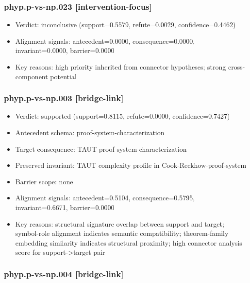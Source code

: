 \documentclass[
]{article}
\newcounter{none} %
\providecommand{\tightlist}{%
  \setlength{\itemsep}{0pt}\setlength{\parskip}{0pt}}
\begin{document}
\subsubsection{phyp.p-vs-np.023
{[}intervention-focus{]}}\label{phypp-vs-np023-intervention-focus}

\begin{itemize}
\tightlist
\item
  Verdict: inconclusive (support=0.5579, refute=0.0029,
  confidence=0.4462)
\item
  Alignment signals: antecedent=0.0000, consequence=0.0000,
  invariant=0.0000, barrier=0.0000
\item
  Key reasons: high priority inherited from connector hypotheses; strong
  cross-component potential
\end{itemize}

\subsubsection{phyp.p-vs-np.003
{[}bridge-link{]}}\label{phypp-vs-np003-bridge-link}

\begin{itemize}
\tightlist
\item
  Verdict: supported (support=0.8115, refute=0.0000, confidence=0.7427)
\item
  Antecedent schema: proof-system-characterization
\item
  Target consequence: TAUT-proof-system-characterization
\item
  Preserved invariant: TAUT complexity profile in
  Cook-Reckhow-proof-system
\item
  Barrier scope: none
\item
  Alignment signals: antecedent=0.5104, consequence=0.5795,
  invariant=0.6671, barrier=0.0000
\item
  Key reasons: structural signature overlap between support and target;
  symbol-role alignment indicates semantic compatibility; theorem-family
  embedding similarity indicates structural proximity; high connector
  analysis score for support-\textgreater target pair
\end{itemize}

\subsubsection{phyp.p-vs-np.004
{[}bridge-link{]}}\label{phypp-vs-np004-bridge-link}
\end{document}
